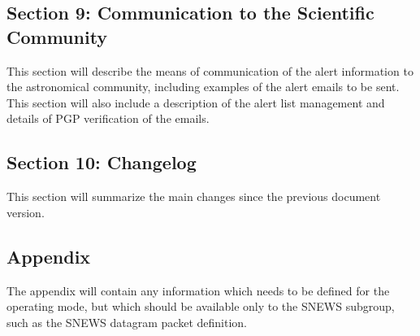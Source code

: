 \documentclass{article}
\begin{document}
\subsection*{Section 9: Communication to the Scientific Community}

This section will describe the means of communication
of the alert information to the astronomical community, including
examples of the alert emails to be sent.
This section will also include a description of the alert list management
and details of PGP verification of the emails.

\subsection*{Section 10: Changelog}

This section will summarize the main changes since the previous document
version.

\subsection{Appendix}

The appendix will contain any information which needs to be defined
for the operating mode, but which should be available only
to the SNEWS subgroup, such as the SNEWS datagram packet definition.
\end{document}
